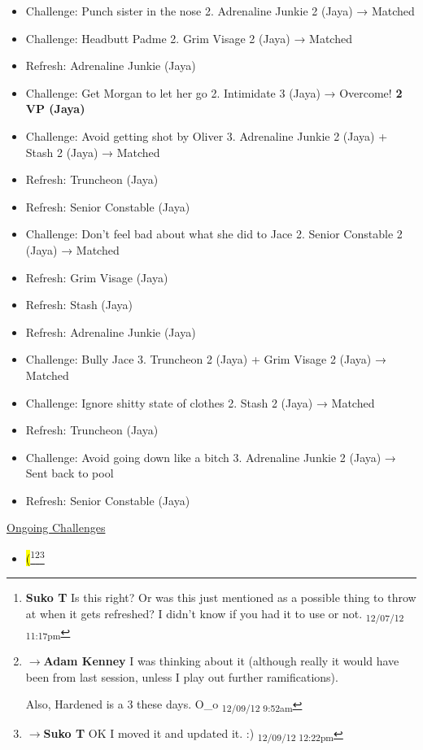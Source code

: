 \begin{itemize}
\item Challenge: Punch sister in the nose 2.  Adrenaline Junkie 2 (Jaya) → Matched
\item Challenge: Headbutt Padme 2. Grim Visage 2 (Jaya) → Matched
\item Refresh: Adrenaline Junkie (Jaya)
\item Challenge: Get Morgan to let her go 2.  Intimidate 3 (Jaya) → Overcome! \textbf{2 VP (Jaya)}
\item Challenge: Avoid getting shot by Oliver 3. Adrenaline Junkie 2 (Jaya) + Stash 2 (Jaya) → Matched
\item Refresh: Truncheon (Jaya)
\item Refresh: Senior Constable (Jaya)
\item Challenge: Don't feel bad about what she did to Jace 2.  Senior Constable 2 (Jaya) → Matched
\item Refresh: Grim Visage (Jaya)
\item Refresh: Stash (Jaya)
\item Refresh: Adrenaline Junkie (Jaya)
\item Challenge: Bully Jace 3.  Truncheon 2 (Jaya) + Grim Visage 2 (Jaya) → Matched
\item Challenge: Ignore shitty state of clothes 2.  Stash 2 (Jaya) → Matched
\item Refresh: Truncheon (Jaya)
\item Challenge: Avoid going down like a bitch 3. Adrenaline Junkie 2 (Jaya) → Sent back to pool
\item Refresh: Senior Constable (Jaya)
\end{itemize}



\underline{  {\LARGE Ongoing Challenges }  }

\begin{itemize}
\item \hl{(}\footnote{\textbf{Suko T }Is this right?  Or was this just mentioned as a possible thing to throw at when it gets refreshed?  I didn't know if you had it to use or not. \textsubscript{12/07/12 11:17pm}}\footnote{$\rightarrow$\textbf{Adam Kenney }I was thinking about it (although really it would have been from last session, unless I play out further ramifications).

Also, Hardened is a 3 these days. O\_o \textsubscript{12/09/12 9:52am}}\footnote{$\rightarrow$\textbf{Suko T }OK I moved it and updated it. :) \textsubscript{12/09/12 12:22pm}}
\end{itemize}



